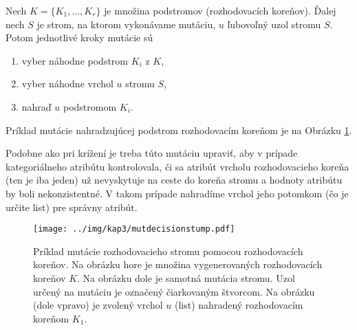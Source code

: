 Nech $K=\{K_1,\ldots,K_r\}$ je množina podstromov (rozhodovacích koreňov). Ďalej nech $S$ je strom, na ktorom vykonávame mutáciu, $u$ ľubovoľný uzol stromu $S$. Potom jednotlivé kroky mutácie sú 
\begin{enumerate}
\item vyber náhodne podstrom $K_i$ z $K$,
\item vyber náhodne vrchol $u$ stromu $S$,
\item nahraď $u$ podstromom $K_i$.
\end{enumerate}
Príklad mutácie nahradzujúcej podstrom rozhodovacím koreňom je na Obrázku \ref{fig:mutdecisionstump}.

Podobne ako pri krížení je treba túto mutáciu upraviť, aby v prípade kategoriálneho atribútu kontrolovala, či sa atribút vrcholu rozhodovacieho koreňa (ten je iba jeden) už nevyskytuje na ceste do koreňa stromu a hodnoty atribútu by boli nekonzistentné. V takom prípade nahradíme vrchol jeho potomkom  (čo je určite list) pre správny atribút.

\begin{figure}[h]
\centering
\centerline{\mbox{\texttt{[image: ../img/kap3/mutdecisionstump.pdf]}}}
\caption{Príklad mutácie rozhodovacieho stromu pomocou rozhodovacích koreňov. Na obrázku hore je množina vygenerovaných rozhodovacích koreňov $K$. Na obrázku dole je samotná mutácia stromu. Uzol určený na mutáciu je označený čiarkovaným štvorcom. Na obrázku (dole vpravo) je zvolený vrchol $u$ (list) nahradený rozhodovacím koreňom $K_1$. }\label{fig:mutdecisionstump}
\end{figure}